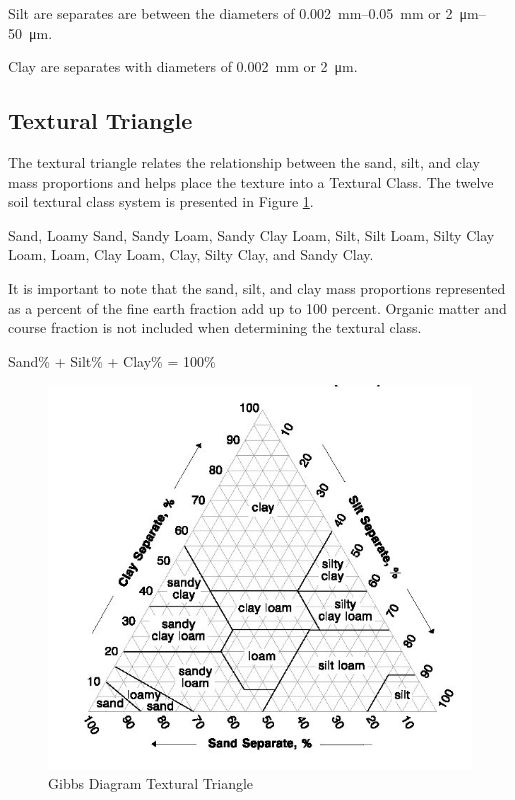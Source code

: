 \documentclass{book}
\begin{document}
Silt are separates are between the diameters of \qtyrange{0.002}{0.05}{mm} or \qtyrange{2}{50}{\micro\metre}.

Clay are separates with diameters of \qty{0.002}{mm} or \qty{2}{\micro\metre}.

\subsection{Textural Triangle}
    
The textural triangle relates the relationship between the sand, silt, and clay mass proportions and helps place the texture into a Textural Class. The twelve soil textural class system is presented in Figure \ref{fig:TexturalTriangle}.
    
Sand, Loamy Sand, Sandy Loam, Sandy Clay Loam, Silt, Silt Loam, Silty Clay Loam, Loam, Clay Loam, Clay, Silty Clay, and Sandy Clay.
    
It is important to note that the sand, silt, and clay mass proportions represented as a percent of the fine earth fraction add up to 100 percent. Organic matter and course fraction is not included when determining the textural class.
    
\begin{center}
Sand\% + Silt\% + Clay\% = 100\%
\end{center}
    
\begin{figure}
    \centering
    \includegraphics{images/TexturalTriangle.jpg}
    \caption{Gibbs Diagram Textural Triangle}
    \label{fig:TexturalTriangle}
\end{figure}
    
\end{document}
